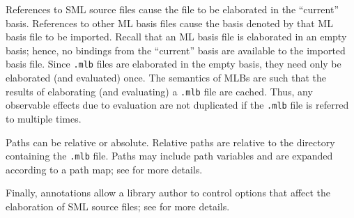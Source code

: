 References to SML source files cause the file to be elaborated in the
``current'' basis.  References to other ML basis files cause the basis
denoted by that ML basis file to be imported.  Recall that an ML basis
file is elaborated in an empty basis; hence, no bindings from the
``current'' basis are available to the imported basis file.  Since
{\tt .mlb} files are elaborated in the empty basis, they need only be
elaborated (and evaluated) once.  The semantics of MLBs are such that
the results of elaborating (and evaluating) a {\tt .mlb} file are
cached.  Thus, any observable effects due to evaluation are not
duplicated if the {\tt .mlb} file is referred to multiple times.

Paths can be relative or absolute.  Relative paths are relative to the
directory containing the {\tt .mlb} file.  Paths may include path
variables and are expanded according to a path map; see
 for more details.

Finally, annotations allow a library author to control options that
affect the elaboration of SML source files; see  for
more details.

%

